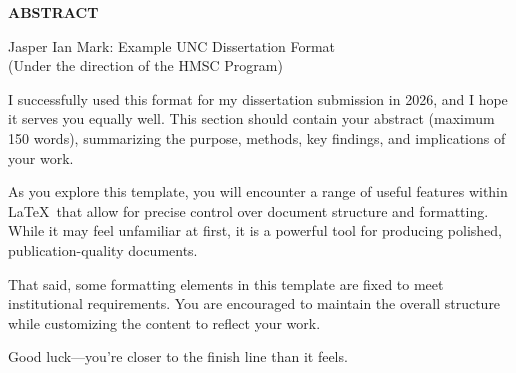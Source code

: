 

\begin{center}
\vspace*{50pt}
{\normalfont\textbf{ABSTRACT}}
\vspace{11pt}

\begin{singlespace}
Jasper Ian Mark: Example UNC Dissertation Format\\
(Under the direction of the HMSC Program)
\end{singlespace}
\end{center}

I successfully used this format for my dissertation submission in 2026, and I hope it serves you equally well. This section should contain your abstract (maximum 150 words), summarizing the purpose, methods, key findings, and implications of your work.

As you explore this template, you will encounter a range of useful features within \LaTeX\ that allow for precise control over document structure and formatting. While it may feel unfamiliar at first, it is a powerful tool for producing polished, publication-quality documents.

That said, some formatting elements in this template are fixed to meet institutional requirements. You are encouraged to maintain the overall structure while customizing the content to reflect your work.

Good luck—you’re closer to the finish line than it feels.

\clearpage
